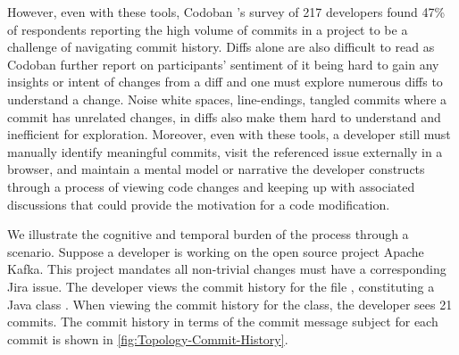 However, even with these tools, Codoban \etal's \cite{codoban_software_2015} survey of 217 developers found 47\% of respondents reporting the high volume of commits in a project to be a challenge of navigating commit history. 
Diffs alone are also difficult to read as Codoban \etal \cite{codoban_software_2015} further report on participants' sentiment of it being hard to gain any insights or intent of changes from a diff and one must explore numerous diffs to understand a change. 
Noise \eg white spaces, line-endings, tangled commits where a commit has unrelated changes, \etc in diffs also make them hard to understand and inefficient for exploration. 
Moreover, even with these tools, a developer still must manually identify meaningful commits, visit the referenced issue externally in a browser, and maintain a mental model or narrative the developer constructs through a process of viewing code changes and keeping up with associated discussions that could provide the motivation for a code modification. 

We illustrate the cognitive and temporal burden of the process through a scenario.
Suppose a developer is working on the open source project Apache Kafka. 
This project mandates all non-trivial changes must have a corresponding Jira issue. 
The developer views the commit history for the file , constituting a Java class . 
When viewing the commit history for the  class, the developer sees 21 commits.
The commit history in terms of the commit message subject for each commit is shown in \autoref{fig:Topology-Commit-History}.

